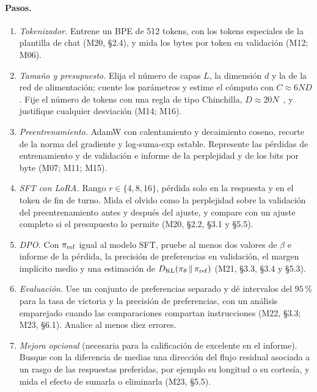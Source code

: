 \paragraph{Pasos.}
\begin{enumerate}[label=\arabic*.]
  \item \emph{Tokenizador.} Entrene un BPE de 512 tokens, con los tokens especiales de la plantilla de chat (M20, §2.4), y mida los bytes por token en validación (M12; M06).
  \item \emph{Tamaño y presupuesto.} Elija el número de capas $L$, la dimensión $d$ y la de la red de alimentación; cuente los parámetros y estime el cómputo con $C\approx 6ND$. Fije el número de tokens con una regla de tipo Chinchilla, $D\approx 20N$~\cite{hoffmann}, y justifique cualquier desviación (M14; M16).
  \item \emph{Preentrenamiento.} AdamW con calentamiento y decaimiento coseno, recorte de la norma del gradiente y log-suma-exp estable. Represente las pérdidas de entrenamiento y de validación e informe de la perplejidad y de los bits por byte (M07; M11; M15).
  \item \emph{SFT con LoRA.} Rango $r\in\{4,8,16\}$, pérdida solo en la respuesta y en el token de fin de turno. Mida el olvido como la perplejidad sobre la validación del preentrenamiento antes y después del ajuste, y compare con un ajuste completo si el presupuesto lo permite (M20, §2.2, §3.1 y §5.5).
  \item \emph{DPO.} Con $\pi_{\mathrm{ref}}$ igual al modelo SFT, pruebe al menos dos valores de $\beta$ e informe de la pérdida, la precisión de preferencias en validación, el margen implícito medio y una estimación de $D_{\mathrm{KL}}(\pi_\theta\,\|\,\pi_{\mathrm{ref}})$ (M21, §3.3, §3.4 y §5.3).
  \item \emph{Evaluación.} Use un conjunto de preferencias separado y dé intervalos del $95\,\%$ para la tasa de victoria y la precisión de preferencias, con un análisis emparejado cuando las comparaciones compartan instrucciones (M22, §3.3; M23, §6.1). Analice al menos diez errores.
  \item \emph{Mejora opcional} (necesaria para la calificación de excelente en el informe). Busque con la diferencia de medias una dirección del flujo residual asociada a un rasgo de las respuestas preferidas, por ejemplo su longitud o su cortesía, y mida el efecto de sumarla o eliminarla (M23, §5.5).
\end{enumerate}

